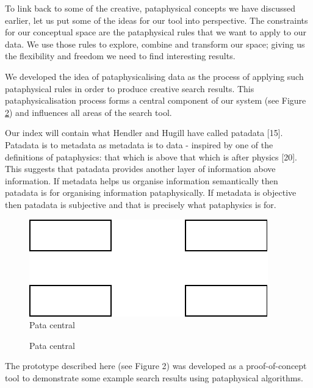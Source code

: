 To link back to some of the creative, pataphysical concepts we have discussed earlier, let us put some of the ideas for our tool into perspective. The constraints for our conceptual space are the pataphysical rules that we want to apply to our data. We use those rules to explore, combine and transform our space; giving us the flexibility and freedom we need to find interesting results.

We developed the idea of pataphysicalising data as the process of applying such pataphysical rules in order to produce creative search results. This pataphysicalisation process forms a central component of our system (see Figure \ref{fig:patasearch01}) and influences all areas of the search tool.

Our index will contain what Hendler and Hugill have called patadata [15].  Patadata is to metadata as metadata is to data - inspired by one of the definitions of pataphysics: that which is above that which is after physics [20]. This suggests that patadata provides another layer of information above information.  If metadata helps us organise information semantically then patadata is for organising information pataphysically. If metadata is objective then patadata is subjective and that is precisely what pataphysics is for.


\begin{figure}[htb] %
  \centering
  \includegraphics[width=\linewidth]{images/patasearch01}
\caption[Pata central]{Pata central}
\label{fig:patasearch01}
\end{figure}

\begin{figure}[htb] %
  \centering
  
\caption[Pata central]{Pata central}
\label{fig:patasearch01}
\end{figure}

The prototype described here (see Figure 2) was developed as a proof-of-concept tool to demonstrate some example search results using pataphysical algorithms.

